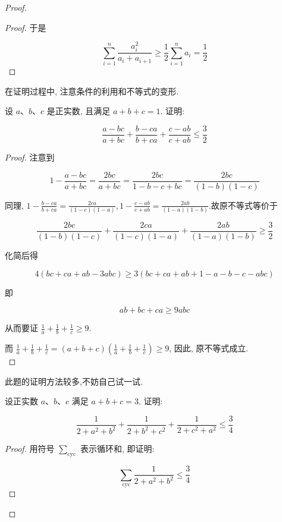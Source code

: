 \begin{proof}
\begin{proof}
	于是
	
	$$
	\sum_{i=1}^{n} \frac{a_{i}^{2}}{a_{i}+a_{i+1}} \geqslant \frac{1}{2} \sum_{i=1}^{n} a_{i}=\frac{1}{2}
	$$
\end{proof}
\begin{note}
	在证明过程中, 注意条件的利用和不等式的变形.
\end{note}

\begin{example}
	设 $a 、 b 、 c$ 是正实数, 且满足 $a+b+c=1$. 证明:
	
	$$
	\frac{a-b c}{a+b c}+\frac{b-c a}{b+c a}+\frac{c-a b}{c+a b} \leqslant \frac{3}{2}
	$$
\end{example}
\begin{proof}
	注意到
	
	$$
	1-\frac{a-b c}{a+b c}=\frac{2 b c}{a+b c}=\frac{2 b c}{1-b-c+b c}=\frac{2 b c}{(1-b)(1-c)}
	$$
	
	同理, $1-\frac{b-c a}{b+c a}=\frac{2 c a}{(1-c)(1-a)}, 1-\frac{c-a b}{c+a b}=\frac{2 a b}{(1-a)(1-b)}$.故原不等式等价于
	
	$$
	\frac{2 b c}{(1-b)(1-c)}+\frac{2 c a}{(1-c)(1-a)}+\frac{2 a b}{(1-a)(1-b)} \geqslant \frac{3}{2}
	$$
	
	化简后得
	
	$$
	4(b c+c a+a b-3 a b c) \geqslant 3(b c+c a+a b+1-a-b-c-a b c)
	$$
	
	即
	
	$$
	a b+b c+c a \geqslant 9 a b c
	$$
	
	从而要证 $\frac{1}{a}+\frac{1}{b}+\frac{1}{c} \geqslant 9$.
	
	而 $\frac{1}{a}+\frac{1}{b}+\frac{1}{c}=(a+b+c)\left(\frac{1}{a}+\frac{1}{b}+\frac{1}{c}\right) \geqslant 9$, 因此, 原不等式成立.\\
\end{proof}
\begin{note}
	此题的证明方法较多,不妨自己试一试.
\end{note}

\begin{example}
	设正实数 $a 、 b 、 c$ 满足 $a+b+c=3$. 证明:
	
	$$
	\frac{1}{2+a^{2}+b^{2}}+\frac{1}{2+b^{2}+c^{2}}+\frac{1}{2+c^{2}+a^{2}} \leqslant \frac{3}{4}
	$$
\end{example}
\begin{proof}
	用符号 $\sum_{\mathrm{cyc}}$ 表示循环和, 即证明:
	
	
	\begin{equation*}
	\sum_{\mathrm{cyc}} \frac{1}{2+a^{2}+b^{2}} \leqslant \frac{3}{4} \tag{1}
	\end{equation*}
	

\end{proof}
\end{proof}
